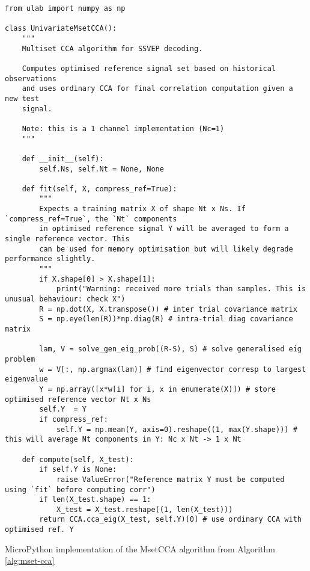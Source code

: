 \begin{listing}[h]
\footnotesize
\begin{verbatim}
from ulab import numpy as np

class UnivariateMsetCCA():
    """
    Multiset CCA algorithm for SSVEP decoding.
    
    Computes optimised reference signal set based on historical observations
    and uses ordinary CCA for final correlation computation given a new test
    signal.
    
    Note: this is a 1 channel implementation (Nc=1)
    """
    
    def __init__(self):
        self.Ns, self.Nt = None, None
        
    def fit(self, X, compress_ref=True):
        """
        Expects a training matrix X of shape Nt x Ns. If `compress_ref=True`, the `Nt` components
        in optimised reference signal Y will be averaged to form a single reference vector. This
        can be used for memory optimisation but will likely degrade performance slightly.         
        """
        if X.shape[0] > X.shape[1]:
            print("Warning: received more trials than samples. This is unusual behaviour: check X")
        R = np.dot(X, X.transpose()) # inter trial covariance matrix
        S = np.eye(len(R))*np.diag(R) # intra-trial diag covariance matrix

        lam, V = solve_gen_eig_prob((R-S), S) # solve generalised eig problem
        w = V[:, np.argmax(lam)] # find eigenvector corresp to largest eigenvalue
        Y = np.array([x*w[i] for i, x in enumerate(X)]) # store optimised reference vector Nt x Ns
        self.Y  = Y
        if compress_ref:
            self.Y = np.mean(Y, axis=0).reshape((1, max(Y.shape))) # this will average Nt components in Y: Nc x Nt -> 1 x Nt
        
    def compute(self, X_test):
        if self.Y is None:
            raise ValueError("Reference matrix Y must be computed using `fit` before computing corr")
        if len(X_test.shape) == 1:
            X_test = X_test.reshape((1, len(X_test)))
        return CCA.cca_eig(X_test, self.Y)[0] # use ordinary CCA with optimised ref. Y

\end{verbatim}
\caption{MicroPython implementation of the MsetCCA algorithm from Algorithm \ref{alg:mset-cca}}
\label{app-listing:mcca-algo}
\end{listing}

